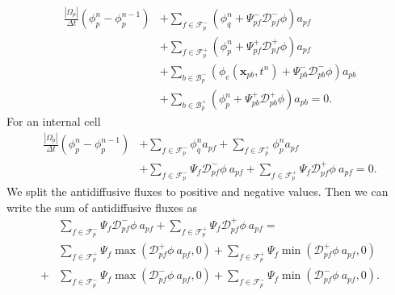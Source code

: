 \documentclass[../thesis.tex]{subfiles}
\begin{document}
\begin{equation}
    \begin{split}
        \frac{|\Omega_p|}{\Delta t}(\phi^{n}_p - \phi_p^{n-1})
        &+ \sum_{f \in \mathcal{F}_p^-}
        \left(
            \phi_q^{n} +\Psi_{pf}^{-}\mathcal{D}^-_{pf}\phi
        \right) a_{pf}\\
        &+ \sum_{f \in \mathcal{F}_p^+}
        \left(
            \phi_p^{n} + \Psi_{pf}^{+}\mathcal{D}^+_{pf}\phi
        \right) a_{pf}\\
        &+ \sum_{b \in \mathcal{B}_p^-}
        \left(
            \phi_e(\boldsymbol{x}_{pb}, t^{n})
            + \Psi_{pb}^-\mathcal{D}^-_{pb}\phi
        \right) a_{pb}\\
        &+ \sum_{b \in \mathcal{B}_p^+}
        \left(\phi_p^{n} +
        \Psi_{pb}^{+}\mathcal{D}^+_{pb}\phi\right) a_{pb} = 0.
    \end{split}
\end{equation}
For an internal cell
\begin{equation}
    \begin{split}
        \frac{|\Omega_p|}{\Delta t}(\phi^{n}_p - \phi_p^{n-1})
        &+ \sum_{f \in \mathcal{F}_p^-} \phi_q^{n} a_{pf}
        + \sum_{f \in \mathcal{F}_p^+} \phi_p^{n} a_{pf}
        \\
        &+ \sum_{f \in \mathcal{F}_p^-}
        \Psi_{f}\mathcal{D}^-_{pf}\phi\ a_{pf}
        + \sum_{f \in \mathcal{F}_p^+}
        \Psi_{f}\mathcal{D}^+_{pf}\phi\ a_{pf}
        = 0.
    \end{split}
\end{equation}
We split the antidiffusive fluxes to positive and negative values.
Then we can write the sum of antidiffusive fluxes as
\begin{equation}
    \begin{split}
        &\sum_{f \in \mathcal{F}_p^-}
        \Psi_{f}\mathcal{D}^-_{pf}\phi\ a_{pf}
        + \sum_{f \in \mathcal{F}_p^+}
        \Psi_{f}\mathcal{D}^+_{pf}\phi\ a_{pf}
        =\\
        &\sum_{f \in \mathcal{F}_p^+}
        \Psi_{f}\max\left( \mathcal{D}^+_{pf}\phi\ a_{pf}, 0 \right)
        +\sum_{f \in \mathcal{F}_p^+}
        \Psi_{f}\min\left( \mathcal{D}^+_{pf}\phi\ a_{pf}, 0 \right)
        \\
        +&\sum_{f \in \mathcal{F}_p^-}
        \Psi_{f}\max\left( \mathcal{D}^-_{pf}\phi\ a_{pf}, 0 \right)
        +\sum_{f \in \mathcal{F}_p^-}
        \Psi_{f}\min\left( \mathcal{D}^-_{pf}\phi\ a_{pf}, 0 \right).
    \end{split}
\end{equation}
\end{document}

